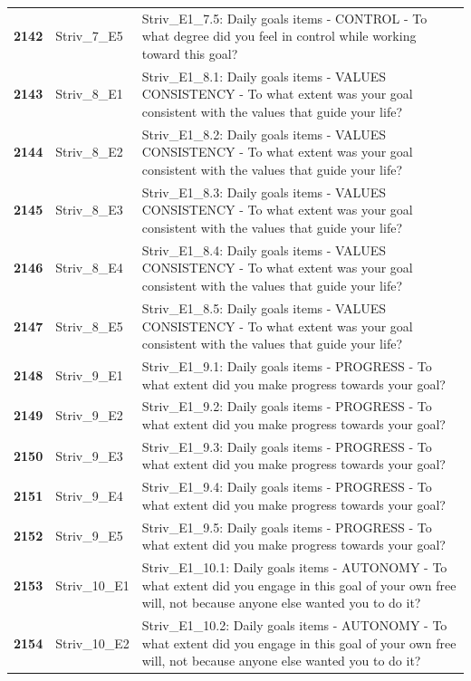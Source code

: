 \documentclass[
  letterpaper,
  DIV=11,
  numbers=noendperiod]{scrartcl}
\begin{document}
\begin{longtable}[t]{>{}cll}
\textbf{2142} & Striv\_7\_E5 & Striv\_E1\_7.5: Daily goals items - CONTROL - To what degree did you feel in control while working toward this goal?\\
\textbf{2143} & Striv\_8\_E1 & Striv\_E1\_8.1: Daily goals items - VALUES CONSISTENCY - To what extent was your goal consistent with the values that guide your life?\\
\textbf{2144} & Striv\_8\_E2 & Striv\_E1\_8.2: Daily goals items - VALUES CONSISTENCY - To what extent was your goal consistent with the values that guide your life?\\
\textbf{2145} & Striv\_8\_E3 & Striv\_E1\_8.3: Daily goals items - VALUES CONSISTENCY - To what extent was your goal consistent with the values that guide your life?\\
\addlinespace
\textbf{2146} & Striv\_8\_E4 & Striv\_E1\_8.4: Daily goals items - VALUES CONSISTENCY - To what extent was your goal consistent with the values that guide your life?\\
\textbf{2147} & Striv\_8\_E5 & Striv\_E1\_8.5: Daily goals items - VALUES CONSISTENCY - To what extent was your goal consistent with the values that guide your life?\\
\textbf{2148} & Striv\_9\_E1 & Striv\_E1\_9.1: Daily goals items - PROGRESS - To what extent did you make progress towards your goal?\\
\textbf{2149} & Striv\_9\_E2 & Striv\_E1\_9.2: Daily goals items - PROGRESS - To what extent did you make progress towards your goal?\\
\textbf{2150} & Striv\_9\_E3 & Striv\_E1\_9.3: Daily goals items - PROGRESS - To what extent did you make progress towards your goal?\\
\addlinespace
\textbf{2151} & Striv\_9\_E4 & Striv\_E1\_9.4: Daily goals items - PROGRESS - To what extent did you make progress towards your goal?\\
\textbf{2152} & Striv\_9\_E5 & Striv\_E1\_9.5: Daily goals items - PROGRESS - To what extent did you make progress towards your goal?\\
\textbf{2153} & Striv\_10\_E1 & Striv\_E1\_10.1: Daily goals items - AUTONOMY - To what extent did you engage in this goal of your own free will, not because anyone else wanted you to do it?\\
\textbf{2154} & Striv\_10\_E2 & Striv\_E1\_10.2: Daily goals items - AUTONOMY - To what extent did you engage in this goal of your own free will, not because anyone else wanted you to do it?\\

\end{longtable}
\end{document}
